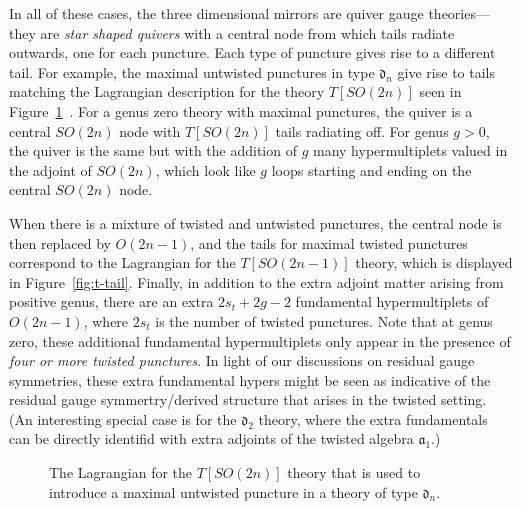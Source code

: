 \documentclass[a4paper]{article}
\def\af{\mathfrak{a}}
\def\df{\mathfrak{d}}
\begin{document}
In all of these cases, the three dimensional mirrors are quiver gauge theories---they are \emph{star shaped quivers} with a central node from which tails radiate outwards, one for each puncture. Each type of puncture gives rise to a different tail. For example, the maximal untwisted punctures in type $\df_n$ give rise to tails matching the Lagrangian description for the theory $T[SO(2n)]$ seen in Figure~\ref{fig:u-tail}~\cite{Gaiotto:2009sym}. For a genus zero theory with maximal punctures, the quiver is a central $SO(2n)$ node with $T[SO(2n)]$ tails radiating off. For genus $g>0$, the quiver is the same but with the addition of $g$ many hypermultiplets valued in the adjoint of $SO(2n)$, which look like $g$ loops starting and ending on the central $SO(2n)$ node.

When there is a mixture of twisted and untwisted punctures, the central node is then replaced by $O(2n-1)$, and the tails for maximal twisted punctures correspond to the Lagrangian for the $T[SO(2n-1)]$ theory, which is displayed in Figure~\ref{fig:t-tail}. Finally, in addition to the extra adjoint matter arising from positive genus, there are an extra $2s_t+2g-2$ fundamental hypermultiplets of $O(2n-1)$, where $2s_t$ is the number of twisted punctures. Note that at genus zero, these additional fundamental hypermultiplets only appear in the presence of \emph{four or more twisted punctures}. In light of our discussions on residual gauge symmetries, these extra fundamental hypers might be seen as indicative of the residual gauge symmertry/derived structure that arises in the twisted setting. (An interesting special case is for the $\df_2$ theory, where the extra fundamentals can be directly identifid with extra adjoints of the twisted algebra $\af_1$.)

\begin{figure}[!t]
	\centering
{}

	\caption{\label{fig:u-tail}The Lagrangian for the $T[SO(2n)]$ theory that is used to introduce a maximal untwisted puncture in a theory of type $\df_n$.}
\end{figure}
\end{document}

